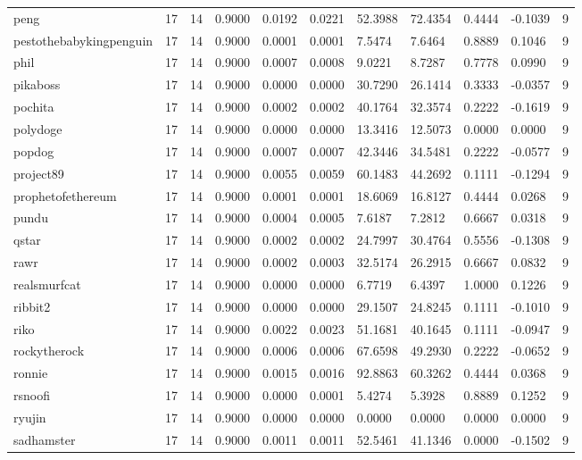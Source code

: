 \begin{table}[htbp]
\begin{tabular}{lllllllllll}
peng & 17 & 14 & 0.9000 & 0.0192 & 0.0221 & 52.3988 & 72.4354 & 0.4444 & -0.1039 & 9 \\
pestothebabykingpenguin & 17 & 14 & 0.9000 & 0.0001 & 0.0001 & 7.5474 & 7.6464 & 0.8889 & 0.1046 & 9 \\
phil & 17 & 14 & 0.9000 & 0.0007 & 0.0008 & 9.0221 & 8.7287 & 0.7778 & 0.0990 & 9 \\
pikaboss & 17 & 14 & 0.9000 & 0.0000 & 0.0000 & 30.7290 & 26.1414 & 0.3333 & -0.0357 & 9 \\
pochita & 17 & 14 & 0.9000 & 0.0002 & 0.0002 & 40.1764 & 32.3574 & 0.2222 & -0.1619 & 9 \\
polydoge & 17 & 14 & 0.9000 & 0.0000 & 0.0000 & 13.3416 & 12.5073 & 0.0000 & 0.0000 & 9 \\
popdog & 17 & 14 & 0.9000 & 0.0007 & 0.0007 & 42.3446 & 34.5481 & 0.2222 & -0.0577 & 9 \\
project89 & 17 & 14 & 0.9000 & 0.0055 & 0.0059 & 60.1483 & 44.2692 & 0.1111 & -0.1294 & 9 \\
prophetofethereum & 17 & 14 & 0.9000 & 0.0001 & 0.0001 & 18.6069 & 16.8127 & 0.4444 & 0.0268 & 9 \\
pundu & 17 & 14 & 0.9000 & 0.0004 & 0.0005 & 7.6187 & 7.2812 & 0.6667 & 0.0318 & 9 \\
qstar & 17 & 14 & 0.9000 & 0.0002 & 0.0002 & 24.7997 & 30.4764 & 0.5556 & -0.1308 & 9 \\
rawr & 17 & 14 & 0.9000 & 0.0002 & 0.0003 & 32.5174 & 26.2915 & 0.6667 & 0.0832 & 9 \\
realsmurfcat & 17 & 14 & 0.9000 & 0.0000 & 0.0000 & 6.7719 & 6.4397 & 1.0000 & 0.1226 & 9 \\
ribbit2 & 17 & 14 & 0.9000 & 0.0000 & 0.0000 & 29.1507 & 24.8245 & 0.1111 & -0.1010 & 9 \\
riko & 17 & 14 & 0.9000 & 0.0022 & 0.0023 & 51.1681 & 40.1645 & 0.1111 & -0.0947 & 9 \\
rockytherock & 17 & 14 & 0.9000 & 0.0006 & 0.0006 & 67.6598 & 49.2930 & 0.2222 & -0.0652 & 9 \\
ronnie & 17 & 14 & 0.9000 & 0.0015 & 0.0016 & 92.8863 & 60.3262 & 0.4444 & 0.0368 & 9 \\
rsnoofi & 17 & 14 & 0.9000 & 0.0000 & 0.0001 & 5.4274 & 5.3928 & 0.8889 & 0.1252 & 9 \\
ryujin & 17 & 14 & 0.9000 & 0.0000 & 0.0000 & 0.0000 & 0.0000 & 0.0000 & 0.0000 & 9 \\
sadhamster & 17 & 14 & 0.9000 & 0.0011 & 0.0011 & 52.5461 & 41.1346 & 0.0000 & -0.1502 & 9 \\

\end{tabular}
\end{table}
